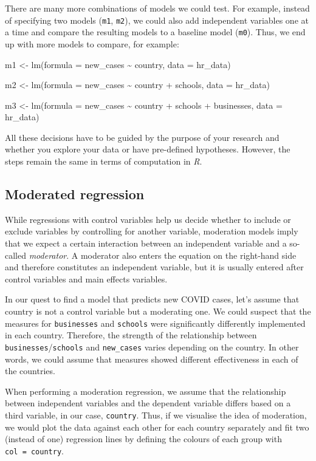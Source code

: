 \documentclass[
  letterpaper,
]{krantz}
\begin{document}
There are many more combinations of models we could test. For example,
instead of specifying two models (\texttt{m1}, \texttt{m2}), we could
also add independent variables one at a time and compare the resulting
models to a baseline model (\texttt{m0}). Thus, we end up with more
models to compare, for example:

\label{four-hierarchical-regressions-nested}
m1 \textless- lm(formula = new\_cases \textasciitilde{} country, data =
hr\_data)

m2 \textless- lm(formula = new\_cases \textasciitilde{} country +
schools, data = hr\_data)

m3 \textless- lm(formula = new\_cases \textasciitilde{} country +
schools + businesses, data = hr\_data)

All these decisions have to be guided by the purpose of your research
and whether you explore your data or have pre-defined hypotheses.
However, the steps remain the same in terms of computation in \emph{R}.

\subsection{Moderated regression}\label{sec-moderated-regression}

While regressions with control variables help us decide whether to
include or exclude variables by controlling for another variable,
moderation models imply that we expect a certain interaction between an
independent variable and a so-called \emph{moderator}. A moderator also
enters the equation on the right-hand side and therefore constitutes an
independent variable, but it is usually entered after control variables
and main effects variables.

In our quest to find a model that predicts new COVID cases, let's assume
that country is not a control variable but a moderating one. We could
suspect that the measures for \texttt{businesses} and \texttt{schools}
were significantly differently implemented in each country. Therefore,
the strength of the relationship between
\texttt{businesses}/\texttt{schools} and \texttt{new\_cases} varies
depending on the country. In other words, we could assume that measures
showed different effectiveness in each of the countries.

When performing a moderation regression, we assume that the relationship
between independent variables and the dependent variable differs based
on a third variable, in our case, \texttt{country}. Thus, if we
visualise the idea of moderation, we would plot the data against each
other for each country separately and fit two (instead of one)
regression lines by defining the colours of each group with
\texttt{col\ =\ country}.
\end{document}
